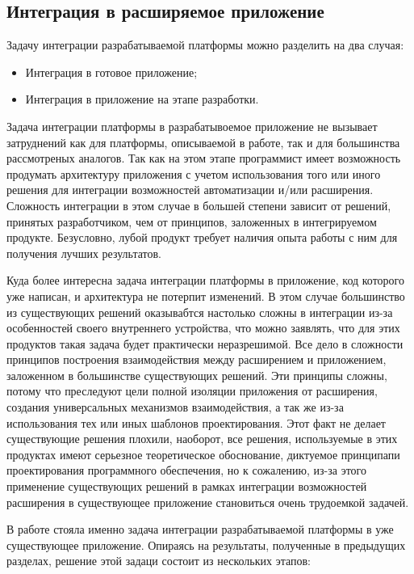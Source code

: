 \subsection{Интеграция в расширяемое приложение}
\label{sec:app-integration}

Задачу интеграции разрабатываемой платформы можно разделить на два случая:

\begin{itemize}
  \item Интеграция в готовое приложение;
  \item Интеграция в приложение на этапе разработки.
\end{itemize}

Задача интеграции платформы в разрабатывоемое приложение не вызывает затруднений как для платформы, описываемой в работе, так и для большинства рассмотреных аналогов. Так как на этом этапе программист имеет возможность продумать архитектуру приложения с учетом использования того или иного решения для интеграции возможностей автоматизации и/или расширения. Сложность интеграции в этом случае в большей степени зависит от решений, принятых разработчиком, чем от принципов, заложенных в интегрируемом продукте. Безусловно, лубой продукт требует наличия опыта работы с ним для получения лучших результатов.

Куда более интересна задача интеграции платформы в приложение, код которого уже написан, и архитектура не потерпит изменений. В этом случае большинство из существующих решений оказывабтся настолько сложны в интеграции из-за особенностей своего внутреннего устройства, что можно заявлять, что для этих продуктов такая задача будет практически неразрешимой. Все дело в сложности принципов построения взаимодействия между расширением и приложением, заложенном в большинстве существующих решений. Эти принципы сложны, потому что преследуют цели полной изоляции приложения от расширения, создания универсальных механизмов взаимодействия, а так же из-за использования тех или иных шаблонов проектирования. Этот факт не делает существующие решения плохили, наоборот, все решения, используемые в этих продуктах имеют серьезное теоретическое обоснование, диктуемое принципапи проектирования программного обеспечения, но к сожалению, из-за этого применение существующих решений в рамках интеграции возможностей расширения в существующее приложение становиться очень трудоемкой задачей.

В работе стояла именно задача интеграции разрабатываемой платформы в уже существующее приложение. Опираясь на результаты, полученные в предыдущих разделах, решение этой задаци состоит из нескольких этапов:

